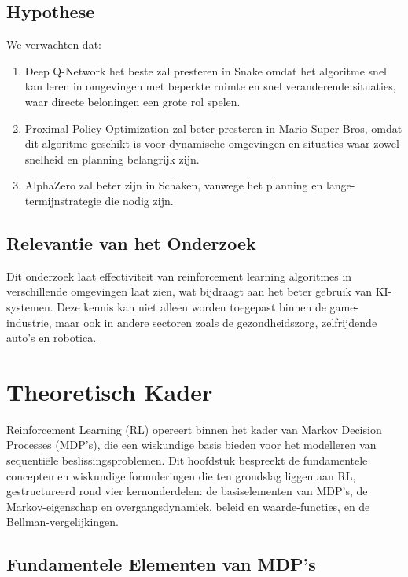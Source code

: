 \documentclass[a4paper,12pt]{report}
\begin{document}
\section{Hypothese}
We verwachten dat:
\begin{enumerate}
    \item Deep Q-Network het beste zal presteren in Snake omdat het algoritme snel kan
          leren in omgevingen met beperkte ruimte en snel veranderende situaties, waar
          directe beloningen een grote rol spelen.

    \item Proximal Policy Optimization zal beter presteren in Mario Super Bros, omdat dit
          algoritme geschikt is voor dynamische omgevingen en situaties waar zowel
          snelheid en planning belangrijk zijn.

    \item AlphaZero zal beter zijn in Schaken, vanwege het planning en
          lange-termijnstrategie die nodig zijn.

\end{enumerate}

\section{Relevantie van het Onderzoek}
Dit onderzoek laat effectiviteit van reinforcement learning algoritmes in
verschillende omgevingen laat zien, wat bijdraagt aan het beter gebruik van
KI-systemen. Deze kennis kan niet alleen worden toegepast binnen de
game-industrie, maar ook in andere sectoren zoals de gezondheidszorg,
zelfrijdende auto's en robotica.

\chapter{Theoretisch Kader}

Reinforcement Learning (RL) opereert binnen het kader van Markov Decision
Processes (MDP's), die een wiskundige basis bieden voor het modelleren van
sequentiële beslissingsproblemen. Dit hoofdstuk bespreekt de fundamentele
concepten en wiskundige formuleringen die ten grondslag liggen aan RL,
gestructureerd rond vier kernonderdelen: de basiselementen van MDP's, de
Markov-eigenschap en overgangsdynamiek, beleid en waarde-functies, en de
Bellman-vergelijkingen.

\section{Fundamentele Elementen van MDP's}
\end{document}

